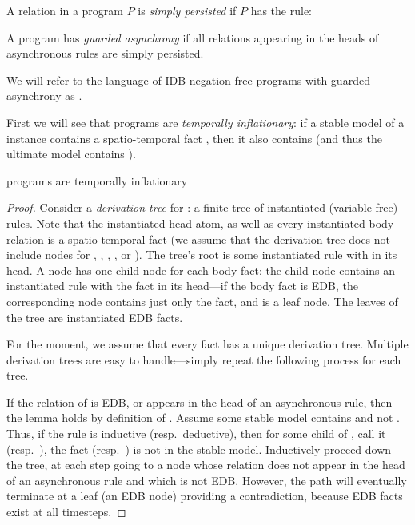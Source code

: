 \begin{definition}
A relation  in a \lang program $P$ is {\em simply persisted} if $P$ has the rule: 
\end{definition}

\begin{definition}
A \lang program has {\em guarded asynchrony} if all relations appearing in the heads of asynchronous rules are simply persisted.
\end{definition}

We will refer to the language of IDB negation-free \lang programs with guarded
asynchrony as \slang.

First we will see that \slang programs are {\em temporally inflationary}: if a stable model
of a \slang instance contains a spatio-temporal fact , then it also
contains  (and thus the ultimate model contains ).

\begin{lemma}
\label{lem:inflationary}
\slang programs are temporally inflationary
\end{lemma}
\begin{proof}
Consider a {\em derivation tree} for : a finite tree of instantiated (variable-free) rules.  Note that the instantiated head atom, as well as every instantiated body relation is a spatio-temporal fact (we assume that the derivation tree does not include nodes for , , , \dedalus{<}, or ).  The tree's root is some instantiated rule with  in its head.  A node has one child node for each body fact: the child node contains an instantiated rule with the fact in its head---if the body fact is EDB, the corresponding node contains just only the fact, and is a leaf node.  The leaves of the tree are instantiated EDB facts.

For the moment, we assume that every fact has a unique derivation tree.  Multiple derivation trees are easy to handle---simply repeat the following process for each tree.

If the relation of  is EDB, or appears in the head of an asynchronous rule, then the lemma holds by definition of \slang.  Assume some stable model contains  and not .  Thus, if the rule is inductive (resp.\ deductive), then for some child of , call it  (resp.\ ), the fact  (resp.\ ) is not in the stable model.  Inductively proceed down the tree, at each step going to a node whose relation does not appear in the head of an asynchronous rule and which is not EDB.  However, the path will eventually terminate at a leaf (an EDB node) providing a contradiction, because EDB facts exist at all timesteps.
\end{proof}

